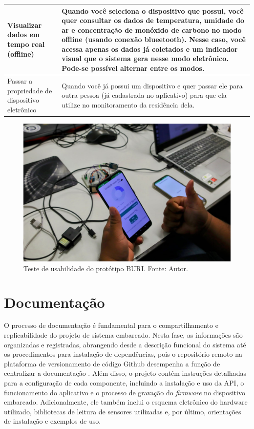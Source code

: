\begin{table}[htbp]
\begin{tabular}{p{4cm}|p{10cm}}
    Visualizar dados em tempo real (offline) & Quando você seleciona o dispositivo que possui, você quer consultar os dados de temperatura, umidade do ar e concentração de monóxido de carbono no modo offline (usando conexão blueetooth). Nesse caso, você acessa apenas os dados já coletados e um indicador visual que o sistema gera nesse modo eletrônico. Pode-se possível alternar entre os modos. \\ \midrule
    Passar a propriedade de dispositivo eletrônico & Quando você já possui um dispositivo e quer passar ele para outra pessoa (já cadastrada no aplicativo) para que ela utilize no monitoramento da residência dela. \\ \bottomrule
    \end{tabular}
\end{table}

\begin{figure}[ht]
    \centering
    \includegraphics[width=.60\textwidth]{img/testes-praticos/hardware/testeBuriHardware1.jpeg}
    \caption{Teste de usabilidade do protótipo BURI. Fonte: Autor.}\label{figTesteHardware}
\end{figure}

\section{Documentação}\label{fase6}

O processo de documentação é fundamental para o compartilhamento e replicabilidade do projeto de sistema 
embarcado. Nesta fase, as informações são organizadas e registradas, abrangendo desde a descrição funcional do sistema até 
os procedimentos para instalação de dependências, pois o repositório remoto na plataforma de versionamento de código Github desempenha
a função de centralizar a documentação \cite{github}. Além disso, o projeto contém instruções detalhadas para a configuração de cada componente, 
incluindo a instalação e uso da API, o funcionamento do aplicativo e o processo de gravação do \textit{firmware} no dispositivo embarcado. Adicionalmente, 
ele também inclui o esquema eletrônico do hardware utilizado, bibliotecas de leitura de sensores utilizadas e, por último, orientações de instalação e exemplos de uso. 

